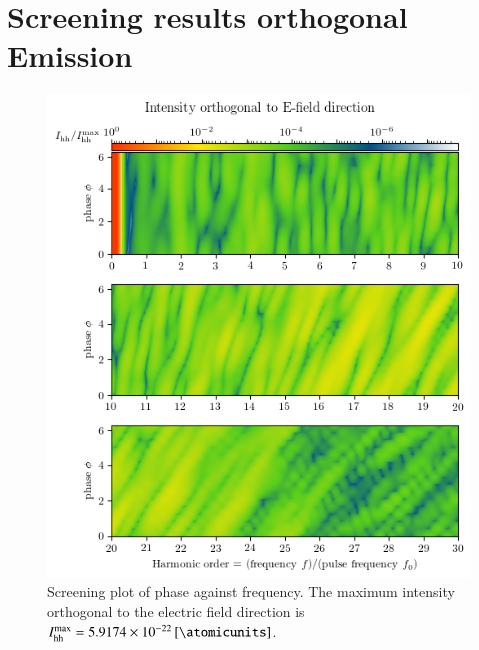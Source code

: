 \documentclass[11pt, a4paper]{scrartcl}
\begin{document}
\section{Screening results orthogonal Emission}
\begin{figure}[H]
    \centering
    \includegraphics[width=\textwidth]{phase=variable_ortho_plot.png}
    \caption{Screening plot of phase against frequency. The maximum intensity orthogonal
      to the electric field direction is $I_{\mathrm{hh}}^{\mathrm{max}} = \SI{5.9174e-22}{[\atomicunits]}$.}
    \label{fig:sec1_orthogonal_screening}
\end{figure}
\end{document}
